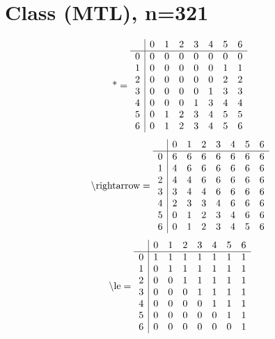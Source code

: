 \documentclass[11pt]{article}
\begin{document}
\section{Class (MTL), n=321}
\[\text{*} = 
\begin{array}{r | r r r r r r r}
 & 0 & 1 & 2 & 3 & 4 & 5 & 6 \\ \hline
0 & 0 & 0 & 0 & 0 & 0 & 0 & 0 \\
1 & 0 & 0 & 0 & 0 & 0 & 1 & 1 \\
2 & 0 & 0 & 0 & 0 & 0 & 2 & 2 \\
3 & 0 & 0 & 0 & 0 & 1 & 3 & 3 \\
4 & 0 & 0 & 0 & 1 & 3 & 4 & 4 \\
5 & 0 & 1 & 2 & 3 & 4 & 5 & 5 \\
6 & 0 & 1 & 2 & 3 & 4 & 5 & 6 \\
\end{array}
\]
\[\text{\textbackslash rightarrow} = 
\begin{array}{r | r r r r r r r}
 & 0 & 1 & 2 & 3 & 4 & 5 & 6 \\ \hline
0 & 6 & 6 & 6 & 6 & 6 & 6 & 6 \\
1 & 4 & 6 & 6 & 6 & 6 & 6 & 6 \\
2 & 4 & 4 & 6 & 6 & 6 & 6 & 6 \\
3 & 3 & 4 & 4 & 6 & 6 & 6 & 6 \\
4 & 2 & 3 & 3 & 4 & 6 & 6 & 6 \\
5 & 0 & 1 & 2 & 3 & 4 & 6 & 6 \\
6 & 0 & 1 & 2 & 3 & 4 & 5 & 6 \\
\end{array}
\]
\[\text{\textbackslash le} = 
\begin{array}{r | r r r r r r r}
 & 0 & 1 & 2 & 3 & 4 & 5 & 6 \\ \hline
0 & 1 & 1 & 1 & 1 & 1 & 1 & 1 \\
1 & 0 & 1 & 1 & 1 & 1 & 1 & 1 \\
2 & 0 & 0 & 1 & 1 & 1 & 1 & 1 \\
3 & 0 & 0 & 0 & 1 & 1 & 1 & 1 \\
4 & 0 & 0 & 0 & 0 & 1 & 1 & 1 \\
5 & 0 & 0 & 0 & 0 & 0 & 1 & 1 \\
6 & 0 & 0 & 0 & 0 & 0 & 0 & 1 \\
\end{array}
\]
\end{document}
